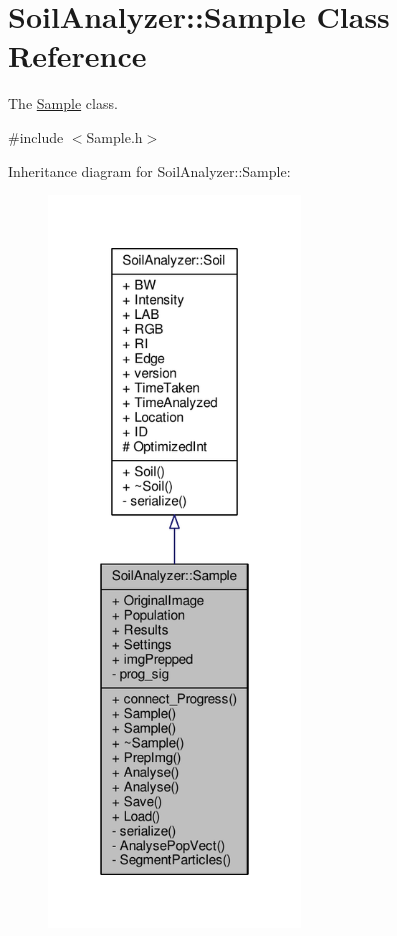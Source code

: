 \hypertarget{class_soil_analyzer_1_1_sample}{}\section{Soil\+Analyzer\+:\+:Sample Class Reference}
\label{class_soil_analyzer_1_1_sample}


The \hyperlink{class_soil_analyzer_1_1_sample}{Sample} class.  




{\ttfamily \#include $<$Sample.\+h$>$}



Inheritance diagram for Soil\+Analyzer\+:\+:Sample\+:\nopagebreak
\begin{figure}[H]
\begin{center}
\leavevmode
\includegraphics[height=550pt]{class_soil_analyzer_1_1_sample__inherit__graph}
\end{center}
\end{figure}


